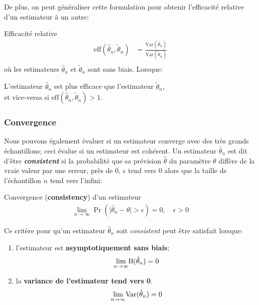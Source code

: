 \documentclass[10pt, french]{article}
\begin{document}
\begin{multicols*}{2}
De plus, on peut généraliser cette formulation pour obtenir l'efficacité relative d'un estimateur à un autre:
\begin{algo}{Efficacité relative}
\begin{align*}
	\text{eff}(\hat\theta_{n}, \tilde\theta_{n})
	&=	\frac{\text{Var}(\hat\theta_{n})}{\text{Var}(\tilde\theta_{n})}		\\
\end{align*}
où les estimateurs $\hat\theta_{n}$ et $\tilde\theta_{n}$ sont sans biais.
\tcbline
Lorsque:
\begin{description}[font = \normalfont]
	\item[$\text{eff}(\hat\theta_{n}, \tilde\theta_{n}) < 1$:]	L'estimateur $\hat{\theta}_{n}$ est plus efficace que l'estimateur $\tilde{\theta}_{n}$, \\
	et vice-versa si $\text{eff}(\hat\theta_{n}, \tilde\theta_{n}) > 1$.
\end{description}
\end{algo}

\columnbreak
\subsubsection{Convergence}
Nous pouvons également évaluer si un estimateur converge avec des très grands échantillons; ceci évalue si un estimateur est cohérent. Un estimateur $\hat{\theta}_{n}$ est dit d'être \og \textit{\textbf{consistent}} \fg{} si la probabilité que sa prévision $\hat{\theta}$ du paramètre $\theta$ diffère de la vraie valeur par une erreur, près de 0, $\epsilon$ tend vers 0 alors que la taille de l'échantillon $n$ tend vers l'infini:
\begin{algo}{Convergence (\textbf{consistency}) d'un estimateur}
\begin{align*}
	\underset{n \rightarrow \infty}{\lim} \Pr(\big| \hat{\theta}_{n} - \theta \big| > \epsilon) = 0, \quad \epsilon > 0
\end{align*}
\end{algo}

Ce critère pour qu'un estimateur $\hat{\theta}_{n}$ soit \og \textit{consistent} \fg{} peut être satisfait lorsque: 
\begin{enumerate}
	\item	l'estimateur est \hypertarget{asympto}{\textbf{asymptotiquement sans biais}};
		\begin{align*}
		\underset{n \rightarrow \infty}{\lim} \text{B}(\hat{\theta}_{n}) = 0
		\end{align*}
	\item	la \textbf{variance de l'estimateur tend vers 0}.
		\begin{align*}
		\underset{n \rightarrow \infty}{\lim} \text{Var}(\hat{\theta}_{n}) = 0
		\end{align*}
\end{enumerate}


\end{multicols*}
\end{document}
